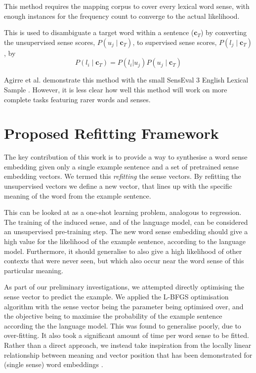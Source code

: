 \documentclass{article} %
\def\parencite{\cite} %
\renewcommand{\c}{\mathbf{c}}
\begin{document}
This method requires the mapping corpus to cover every lexical word sense, with enough instances for the frequency count to converge to the actual likelihood.

This is used to disambiguate a target word within a sentence ($\c_T$)  by converting the unsupervised sense scores, $P(u_j \mid \c_T)$, to supervised sense scores, $P(l_j \mid \c_T)$, by
\begin{equation} \label{eq:agireewsd}
P(l_i \mid \c_T) = P(l_i | u_j) P(u_j \mid \c_T)
\end{equation}


Agirre et al. demonstrate this method with the small SensEval 3 English Lexical Sample \parencite{mihalcea2004senseval}. However, it is less clear how well this method will work on more complete tasks featuring rarer words and senses. 


\section{Proposed Refitting Framework} \label{refitting} \label{Framework}

The key contribution of this work is to provide a way to synthesise a word sense embedding given only a single example sentence and a set of pretrained sense embedding vectors. 
We termed this \emph{refitting} the sense vectors.
By refitting the unsupervised vectors we define a new vector, that lines up with the specific meaning of the word from the example sentence.

This can be looked at as a one-shot learning problem, analogous to regression.
The training of the induced sense, and of the language model, can be considered an unsupervised pre-training step. The new word sense embedding should give a high value for the likelihood of the example sentence, according to the language model. Furthermore, it should generalise to also give a high likelihood of other contexts that were never seen, but which also occur near the word sense of this particular meaning.

As part of our preliminary investigations, we attempted directly optimising the sense vector to predict the example.
We applied the L-BFGS \parencite{nocedal1980updating} optimisation algorithm with the sense vector being the parameter being optimised over, and the objective being to maximise the probability of the example sentence according the the language model.
This was found to generalise poorly, due to over-fitting.
It also took a significant amount of time per word sense to be fitted.
Rather than a direct approach, we instead take inspiration from the locally linear relationship between meaning and vector position that has been demonstrated for (single sense) word embeddings \parencite{mikolov2013efficient,mikolovSkip,mikolov2013linguisticsubstructures}.
\end{document}
